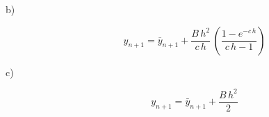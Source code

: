 \begin{enumerate}
\begin{description}
\item[b)]
\begin{equation}
 \label{cap6:sec5:eq28}
 y_{n+1} = \bar{y}_{n+1} + \frac{B\,h^2}{c\,h} \, \left( \frac{1 - e^{-c\,h}}{c\,h - 1} \right)
\end{equation}

\item[c)]
\begin{equation}
 \label{cap6:sec5:eq29}
 y_{n+1} = \bar{y}_{n+1} + \frac{B\,h^2}{2}
\end{equation}

\end{description}

\end{enumerate}
